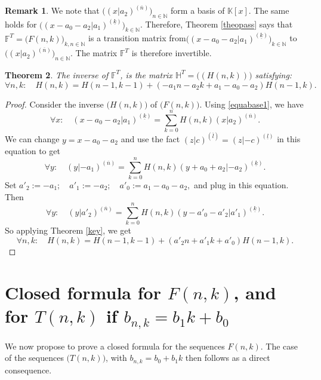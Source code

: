 \documentclass[12pt,a4paper]{article}
\newtheorem{theorem}{Theorem}[section]
\theoremstyle{definition} %
\newtheorem{remark}[theorem]{Remark}%
\theoremstyle{remark}
\theoremstyle{examples}
\newenvironment{porofo}[1][Proof]{%
	\begin{proof}[#1]%
	}{%
	\end{proof}%
}
\newcommand{\suit}[1]{{#1}(n,k)}
\newcommand{\idc}{\in \natu}
\newcommand{\argtgen}[3]{(#1|#2)^{(\overline{#3})}}
\newcommand{\argtgenm}[3]{(#1|#2)^{(\underline{#3})}}
\newcommand{\fiel}[1]{\mathbb{#1}}
\newcommand{\natu}{\mathbb{N}}
\begin{document}
\begin{remark} 	\rm
	We  note that $\big(\argtgen{x}{a_2}{n}\big)_{n\idc}$ form a basis of $\fiel{K}[x]$. The same holds for $\big(\argtgenm{x-a_0-a_2}{a_1}{k}\big)_{k\idc}$. Therefore, Theorem \ref{theopass} says that $\mathbb{F}^T=\big(\suit{F}\big)_{k,n\in \natu}$ is a transition matrix from$\big(\argtgenm{x-a_0-a_2}{a_1}{k}\big)_{k\idc}$  to $\big(\argtgen{x}{a_2}{n}\big)_{n\idc}$. The matrix $\mathbb{F}^T$
	is therefore invertible.
\end{remark}
\begin{theorem}\label{inverse}
	The inverse of  $\mathbb{F}^T$, is the matrix $\mathbb{H}^T=\big((H(n,k))\big)$ satisfying:
	\begin{equation}\label{reps}
	\forall n,k: \quad		H(n,k) = H(n-1,k-1) + (-a_1n-a_2k+a_1-a_0-a_2) H(n-1,k).
	\end{equation}
\end{theorem}
\begin{porofo}
	Consider the inverse $\big(H(n,k)\big)$ of $\big(F(n,k)\big)$. Using \eqref{equabase1}, we have
	$$\displaystyle
	\forall x: \quad \argtgenm{x-a_0-a_2}{a_1}{k}	= \sum_{k=0}^n \suit{H}  \argtgen{x}{a_2}{n}.$$
	We can change $y=x-a_0-a_2$ and use the fact $\argtgen{z}{c}{l}=\argtgenm{z}{-c}{l}$ in this equation to get 
	\[ \forall y: \quad 	\argtgen{y}{-a_1}{n}= \sum_{k=0}^n \suit{H} \argtgenm{y+a_0+a_2}{-a_2}{k}.\]
	Set $a'_2:=-a_1;\quad a'_1:=-a_2; \quad a'_0:=a_1-a_0-a_2,$ and plug in this equation. Then 
	\[\displaystyle
	\forall y: \quad 	\argtgen{y}{a'_2}{n}= \sum_{k=0}^n \suit{H} \argtgenm{y-a'_0-a'_2}{a'_1}{k}.\]
	So applying Theorem \ref{key},  we get
	$$\forall n,k: \quad		H(n,k) = H(n-1,k-1) + (a'_2n+a'_1k+a'_0) H(n-1,k).$$
\end{porofo}


\section{Closed formula for $F(n,k)$, and for $T(n,k)$ if $b_{n,k}=b_1k+b_0$}\label{sect4}
We now propose to prove a closed formula for the sequences $F(n,k)$.  The case of the sequences $\big(T(n,k)\big)$, with $b_{n,k}=b_0+b_1k$ then follows as a direct consequence.
\end{document}
